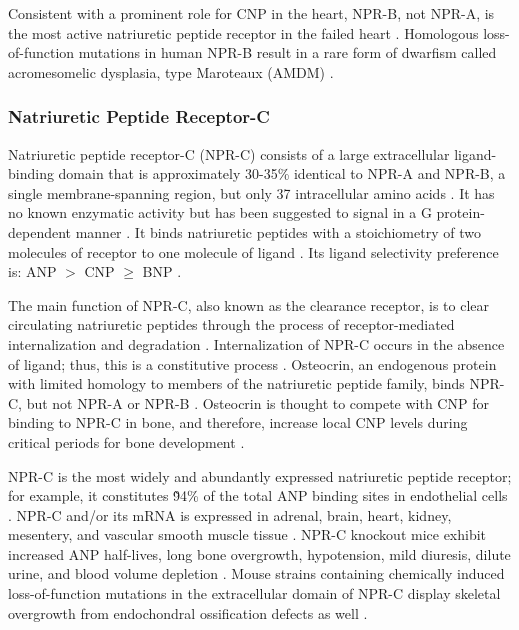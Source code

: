 \documentclass[14pt,a4paper,onecolumn]{extarticle}
\begin{document}
Consistent with a prominent role for CNP in the heart, NPR-B, not NPR-A, is the most active natriuretic peptide receptor in the failed heart \citep{Dickey2007}. Homologous loss-of-function mutations in human NPR-B result in a rare form of dwarfism called acromesomelic dysplasia, type Maroteaux (AMDM) \citep{Bartels2004}.

\subsubsection{Natriuretic Peptide Receptor-C}
Natriuretic peptide receptor-C (NPR-C) consists of a large extracellular ligand-binding domain that is approximately 30-35\% identical to NPR-A and NPR-B, a single membrane-spanning region, but only 37 intracellular amino acids \citep{Chang1989} \citep{Fuller1988} \citep{Porter1990}. It has no known enzymatic activity but has been  suggested to signal in a G protein-dependent manner \citep{Rose2008}.
It binds natriuretic peptides with a stoichiometry of two molecules of receptor to one molecule of ligand \citep{Ammarguellat2001}. Its ligand selectivity preference is: ANP $>$ CNP $\ge$ BNP \citep{Bennett1991} \citep{Suga1992a}.

The main function of NPR-C, also known as the clearance receptor, is to clear circulating natriuretic peptides through the process of receptor-mediated internalization and degradation \citep{Koh1992} \citep{Nussenzveig1990}. Internalization of NPR-C occurs in the absence of ligand; thus, this is a constitutive process \citep{Nussenzveig1990}. Osteocrin, an endogenous protein with limited homology to members of the natriuretic peptide family, binds NPR-C, but not NPR-A or NPR-B \citep{Moffatt2007}. Osteocrin is thought to compete with CNP for binding to NPR-C in bone, and therefore, increase local CNP levels during critical periods for bone development \citep{Moffatt2007}.

NPR-C is the most widely and abundantly expressed natriuretic peptide receptor; for example, it constitutes \~94\% of the total ANP binding sites in endothelial cells \citep{Leitman1986}. NPR-C and/or its mRNA is expressed in adrenal, brain, heart, kidney, mesentery, and vascular smooth muscle tissue \citep{Nagase1997} \citep{Porter1990} \citep{Suga1992c} \citep{Wilcox1991}.
NPR-C knockout mice exhibit increased ANP half-lives, long bone overgrowth, hypotension, mild diuresis, dilute urine, and blood volume depletion  \citep{Matsukawa1999}. Mouse strains containing chemically induced loss-of-function mutations in the extracellular domain of NPR-C display skeletal overgrowth from endochondral ossification defects as well \citep{Jaubert1999}.
\end{document}
